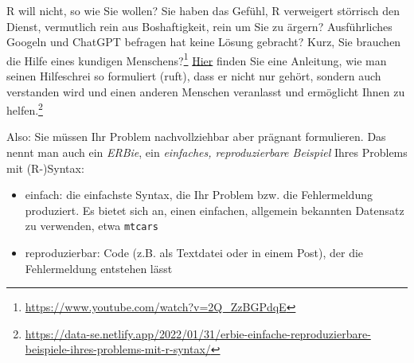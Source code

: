 \documentclass[
  letterpaper,
]{scrbook}
\providecommand{\tightlist}{%
  \setlength{\itemsep}{0pt}\setlength{\parskip}{0pt}}\usepackage{longtable,booktabs,array}
\theoremstyle{definition}
\theoremstyle{definition}
\theoremstyle{definition}
\theoremstyle{remark}
\begin{document}
R will nicht, so wie Sie wollen? Sie haben das Gefühl, R verweigert
störrisch den Dienst, vermutlich rein aus Boshaftigkeit, rein um Sie zu
ärgern? Ausführliches Googeln und ChatGPT befragen hat keine Lösung
gebracht? Kurz, Sie brauchen die Hilfe eines kundigen
Menschens?\footnote{\url{https://www.youtube.com/watch?v=2Q_ZzBGPdqE}}
\href{https://data-se.netlify.app/2022/01/31/erbie-einfache-reproduzierbare-beispiele-ihres-problems-mit-r-syntax/}{Hier}
finden Sie eine Anleitung, wie man seinen Hilfeschrei so formuliert
(ruft), dass er nicht nur gehört, sondern auch verstanden wird und einen
anderen Menschen veranlasst und ermöglicht Ihnen zu helfen.\footnote{\url{https://data-se.netlify.app/2022/01/31/erbie-einfache-reproduzierbare-beispiele-ihres-problems-mit-r-syntax/}}

Also: Sie müssen Ihr Problem nachvollziehbar aber prägnant formulieren.
Das nennt man auch ein \emph{ERBie}, ein \emph{einfaches,
reproduzierbare Beispiel} Ihres Problems mit (R-)Syntax:

\begin{itemize}
\tightlist
\item
  einfach: die einfachste Syntax, die Ihr Problem bzw. die Fehlermeldung
  produziert. Es bietet sich an, einen einfachen, allgemein bekannten
  Datensatz zu verwenden, etwa \texttt{mtcars}
\item
  reproduzierbar: Code (z.B. als Textdatei oder in einem Post), der die
  Fehlermeldung entstehen lässt
\end{itemize}
\end{document}
